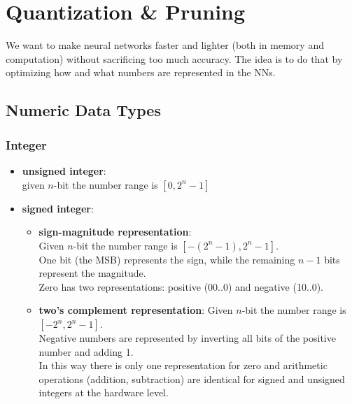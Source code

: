\section{Quantization \& Pruning}
We want to make neural networks faster and lighter (both in memory and computation) without sacrificing too much accuracy. The idea is to do that by optimizing how and what numbers are represented in the NNs.
\subsection{Numeric Data Types}
\subsubsection{Integer}
\begin{itemize}
    \item \textbf{unsigned integer}: \\
    given $n$-bit the number range is $[0, 2^n-1]$


    \item \textbf{signed integer}:
        \begin{itemize}
            \item \textbf{sign-magnitude representation}: \\
            Given $n$-bit the number range is $[-(2^n-1), 2^n-1]$.\\
            One bit (the MSB) represents the sign, while the remaining $n-1$ bits represent the magnitude. \\
            Zero has two representations: positive (00..0) and negative (10..0).
            \item \textbf{two's complement representation}:
            Given $n$-bit the number range is $[-2^n, 2^n-1]$.\\
            Negative numbers are represented by inverting all bits of the positive number and adding 1.\\
            In this way there is only one representation for zero and arithmetic operations (addition, subtraction) are identical for signed and unsigned integers at the hardware level.\\
        \end{itemize}
\end{itemize}
